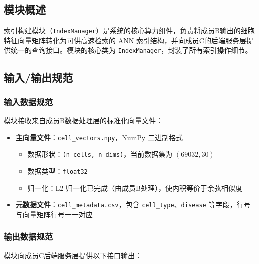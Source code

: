 \documentclass[a4paper]{article}
\begin{document}
\subsection{模块概述}
索引构建模块（\texttt{IndexManager}）是系统的核心算力组件，负责将成员B输出的细胞特征向量矩阵转化为可供高速检索的 ANN 索引结构，并向成员C的后端服务层提供统一的查询接口。模块的核心类为 \texttt{IndexManager}，封装了所有索引操作细节。

\subsection{输入/输出规范}

\subsubsection{输入数据规范}
模块接收来自成员B数据处理层的标准化向量文件：

\begin{itemize}
    \item \textbf{主向量文件}：\texttt{cell\_vectors.npy}，NumPy 二进制格式
    \begin{itemize}
        \item 数据形状：\texttt{(n\_cells, n\_dims)}，当前数据集为 $(69032, 30)$
        \item 数据类型：\texttt{float32}
        \item 归一化：L2 归一化已完成（由成员B处理），使内积等价于余弦相似度
    \end{itemize}
    \item \textbf{元数据文件}：\texttt{cell\_metadata.csv}，包含 \texttt{cell\_type}、\texttt{disease} 等字段，行号与向量矩阵行号一一对应
\end{itemize}

\subsubsection{输出数据规范}
模块向成员C后端服务层提供以下接口输出：
\end{document}
